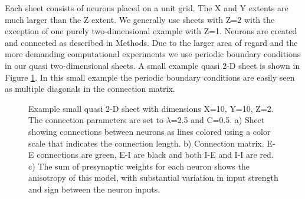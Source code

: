 Each sheet consists of neurons placed on a unit grid. 
The X and Y extents are much larger than the Z extent.
We generally use sheets with Z=2 with the exception of one purely two-dimensional example with Z=1.
Neurons are created and connected as described in Methods.
Due to the larger area of regard and the more demanding computational experiments we use periodic boundary conditions in our quasi two-dimensional sheets.
A small example quasi 2-D sheet is shown in Figure \ref{fig:sheet_structure}.
In this small example the periodic boundary conditions are easily seen as multiple diagonals in the connection matrix.

\begin{figure}[!htb]
 \caption{Example small quasi 2-D sheet with dimensions X=10, Y=10, Z=2. The connection parameters are set to $\lambda$=2.5 and C=0.5. 
 a)  Sheet showing connections between neurons as lines colored using a color scale that indicates the connection length. 
 b)  Connection matrix. E-E connections are green, E-I are black and both I-E and I-I  are red. 
 c) The sum of presynaptic weights for each neuron shows the anisotropy of this model, with substantial variation in input strength and sign between the neuron inputs.}
 \label{fig:sheet_structure}
\end{figure}

